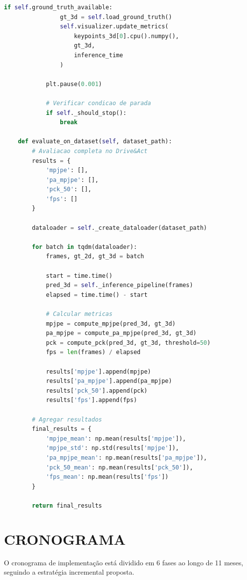 \documentclass[12pt, a4paper]{article}
\begin{document}
\begin{lstlisting}[language=Python, caption=Pipeline Completo]
            if self.ground_truth_available:
                gt_3d = self.load_ground_truth()
                self.visualizer.update_metrics(
                    keypoints_3d[0].cpu().numpy(),
                    gt_3d,
                    inference_time
                )
            
            plt.pause(0.001)
            
            # Verificar condicao de parada
            if self._should_stop():
                break
    
    def evaluate_on_dataset(self, dataset_path):
        # Avaliacao completa no Drive&Act
        results = {
            'mpjpe': [],
            'pa_mpjpe': [],
            'pck_50': [],
            'fps': []
        }
        
        dataloader = self._create_dataloader(dataset_path)
        
        for batch in tqdm(dataloader):
            frames, gt_2d, gt_3d = batch
            
            start = time.time()
            pred_3d = self._inference_pipeline(frames)
            elapsed = time.time() - start
            
            # Calcular metricas
            mpjpe = compute_mpjpe(pred_3d, gt_3d)
            pa_mpjpe = compute_pa_mpjpe(pred_3d, gt_3d)
            pck = compute_pck(pred_3d, gt_3d, threshold=50)
            fps = len(frames) / elapsed
            
            results['mpjpe'].append(mpjpe)
            results['pa_mpjpe'].append(pa_mpjpe)
            results['pck_50'].append(pck)
            results['fps'].append(fps)
        
        # Agregar resultados
        final_results = {
            'mpjpe_mean': np.mean(results['mpjpe']),
            'mpjpe_std': np.std(results['mpjpe']),
            'pa_mpjpe_mean': np.mean(results['pa_mpjpe']),
            'pck_50_mean': np.mean(results['pck_50']),
            'fps_mean': np.mean(results['fps'])
        }
        
        return final_results
\end{lstlisting}

\section{CRONOGRAMA}

O cronograma de implementação está dividido em 6 fases ao longo de 11 meses, seguindo a estratégia incremental proposta.
\end{document}
